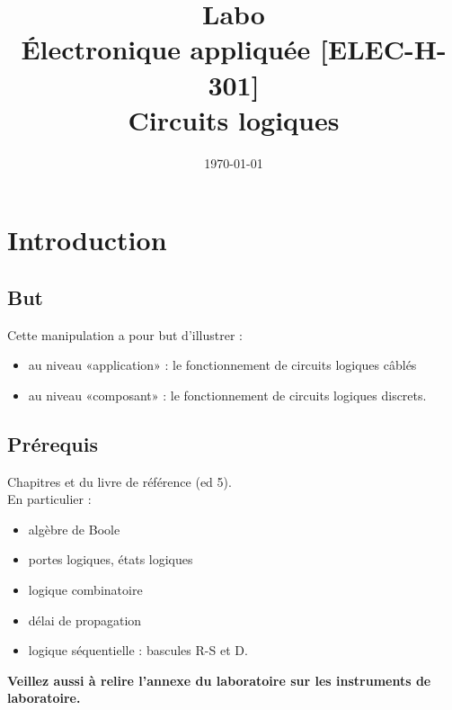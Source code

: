 \documentclass[11pt,a4paper]{article}
\date{\vspace{-1.7cm}\mydate\today}
\title{\vspace{-2cm} Labo \no 5\\ Électronique appliquée [ELEC-H-301]\\Circuits logiques\ifthenelse{\boolean{corrige}}{~\\Corrigé}{}}
\theoremstyle{definition}%
\begin{document}
\pagestyle{fancy}
\maketitle
\vspace*{-1cm}
\section{Introduction}

\subsection{But}
Cette manipulation a pour but d'illustrer :
\begin{itemize}
\item au niveau «application» : le fonctionnement de circuits logiques câblés
\item au niveau «composant» : le fonctionnement de circuits logiques discrets.
\end{itemize}

\subsection{Prérequis}
Chapitres  et   du livre de référence (ed 5).\\ En particulier :
\begin{itemize}
\item algèbre de Boole
\item portes logiques, états logiques
\item logique combinatoire
\item délai de propagation
\item logique séquentielle : bascules R-S et D.
\end{itemize}

\textbf{Veillez aussi à relire l'annexe du laboratoire  sur les instruments de laboratoire.}


\end{document}
